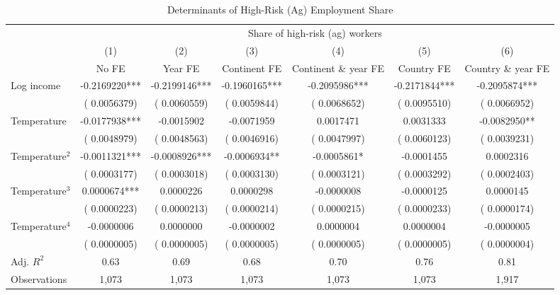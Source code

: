 \begin{table}[htbp]
\centering
  \caption{Determinants of High-Risk (Ag) Employment Share}
  \label{tab:highrisk_reg_tableE1_newrisk}
  \begin{tabular}{l*{6}{c}}
    \toprule
    & \multicolumn{6}{c}{Share of high-risk (ag) workers} \\
    \cmidrule(lr){2-7}
    & (1) & (2) & (3) & (4) & (5) & (6) \\
    & No FE & Year FE & Continent FE & Continent \& year FE & Country FE & Country \& year FE \\
    \midrule
    Log income & -0.2169220*** & -0.2199146*** & -0.1960165*** & -0.2095986*** & -0.2171844*** & -0.2095874*** \\
    & ( 0.0056379) & ( 0.0060559) & ( 0.0059844) & ( 0.0068652) & ( 0.0095510) & ( 0.0066952) \\
    Temperature & -0.0177938*** & -0.0015902 & -0.0071959 &  0.0017471 &  0.0031333 & -0.0082950** \\
    & ( 0.0048979) & ( 0.0048563) & ( 0.0046916) & ( 0.0047997) & ( 0.0060123) & ( 0.0039231) \\
    Temperature$^2$ & -0.0011321*** & -0.0008926*** & -0.0006934** & -0.0005861* & -0.0001455 &  0.0002316 \\
    & ( 0.0003177) & ( 0.0003018) & ( 0.0003130) & ( 0.0003121) & ( 0.0003292) & ( 0.0002403) \\
    Temperature$^3$ &  0.0000674*** &  0.0000226 &  0.0000298 & -0.0000008 & -0.0000125 &  0.0000145 \\
    & ( 0.0000223) & ( 0.0000213) & ( 0.0000214) & ( 0.0000215) & ( 0.0000233) & ( 0.0000174) \\
    Temperature$^4$ & -0.0000006 &  0.0000000 & -0.0000002 &  0.0000004 &  0.0000004 & -0.0000005 \\
    & ( 0.0000005) & ( 0.0000005) & ( 0.0000005) & ( 0.0000005) & ( 0.0000005) & ( 0.0000004) \\
    \midrule
    Adj. $R^2$ & 0.63 & 0.69 & 0.68 & 0.70 & 0.76 & 0.81 \\
    Observations &     1,073 &     1,073 &     1,073 &     1,073 &     1,073 &     1,917 \\
    \bottomrule
  \end{tabular}
\end{table}
